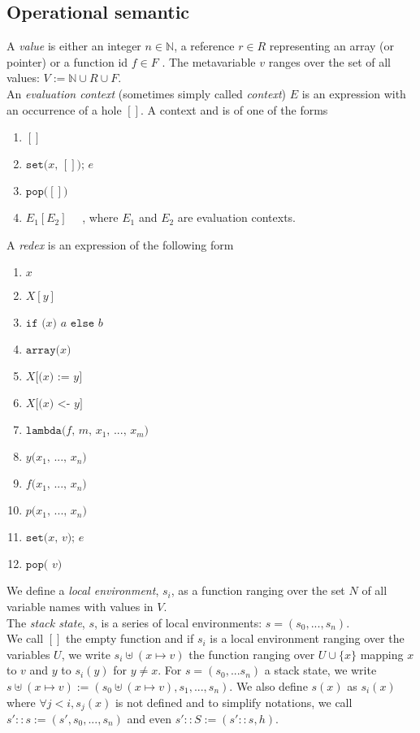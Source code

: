 \documentclass[12pt,a4paper]{article}
\newcommand{\cl}[1]{\texttt{#1}}
\newcommand{\N}{\mathbb{N}}
\newcommand{\econt}[1]{[#1]}
\begin{document}
\subsection{Operational semantic}

A \emph{value} is either an integer $n \in \N$, a reference $r \in R$ representing an array (or pointer) or a function id $f \in F$ . The metavariable $v$ ranges over the set of all values: $V := \N \cup R \cup F$.\\

An \emph{evaluation context} (sometimes simply called \emph{context}) $E$ is an expression with an occurrence of a hole $\econt{}$. A context  and is of one of the forms
\begin{enumerate}
\itemsep-0.2em
\item $\econt{}$
\item $\cl{set(} x \cl{, } \econt{} \cl{); } e$
\item $\cl{pop(} \econt{} \cl{)}$
\item $E_1\econt{E_2}$ \ \ , where $E_1$ and $E_2$ are evaluation contexts.
\end{enumerate}

A \emph{redex} is an expression of the following form
\begin{enumerate}
\itemsep-0.2em
\item $x$
\item $X[y]$
\item $\cl{if (} x \cl{) } a \cl{ else } b $
\item $\cl{array(} x \cl{)}$
\item $X\cl{[(} x \cl{) := } y \cl{]}$
\item $X\cl{[(} x \cl{) <- } y \cl{]}$
\item $\cl{lambda(}  f \cl{, } m \cl{, } x_1 \cl{, } ... \cl{, } x_m \cl{)}$
\item $y\cl{(} x_1 \cl{, } ... \cl{, } x_n \cl{)}$
\item $f\cl{(} x_1 \cl{, } ... \cl{, } x_n \cl{)}$
\item $p\cl{(} x_1 \cl{, } ... \cl{, } x_n \cl{)}$
\item $\cl{set(} x \cl{, } v \cl{); } e$
\item $\cl{pop( } v \cl{)}$
\end{enumerate}

We define a \emph{local environment}, $s_i$, as a function ranging over the set $N$ of all variable names with values in $V$.\\
The \emph{stack state}, $s$, is a series of local environments: $s = (s_0, ... , s_n)$.\\
We call $[]$ the empty function and if $s_i$ is a local environment ranging over the variables $U$, we write $s_i \uplus (x \mapsto v)$ the function ranging over $U \cup \{x\}$ mapping $x$ to $v$ and $y$ to $s_i(y)$ for $y \neq x$. For $s = (s_0, ... s_n)$ a stack state, we write $s \uplus (x \mapsto v) := \left( s_0 \uplus (x \mapsto v), s_1, ... , s_n \right)$. We also define $s(x)$ as $s_i(x)$ where $\forall j < i, s_j(x)$ is not defined and to simplify notations, we call $s' :: s := (s', s_0, ... , s_n)$ and even $s' :: S  := (s' :: s, h)$.
\end{document}
